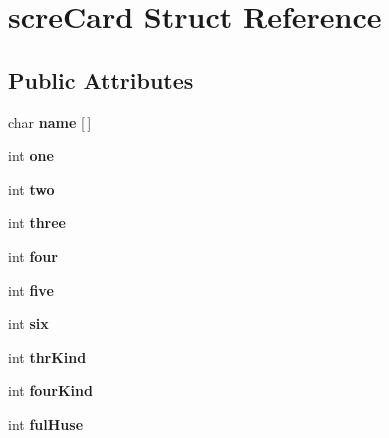 \hypertarget{structscre_card}{}\section{scre\+Card Struct Reference}
\label{structscre_card}
\subsection*{Public Attributes}
\begin{DoxyCompactItemize}
\item 
\mbox{\label{structscre_card_a142a055fa3894891503722f06c691a4d}} 
char {\bfseries name} \mbox{[}$\,$\mbox{]}
\item 
\mbox{\label{structscre_card_aca36017ce3ff1201a38b9c975c20d242}} 
int {\bfseries one}
\item 
\mbox{\label{structscre_card_a5d802886236a00e701bb68c5ba7de71e}} 
int {\bfseries two}
\item 
\mbox{\label{structscre_card_a44b505ee324fb103931d5a1e2ce9b5d1}} 
int {\bfseries three}
\item 
\mbox{\label{structscre_card_ad9586f49eeb39857826c114c5c1a65cb}} 
int {\bfseries four}
\item 
\mbox{\label{structscre_card_a39fb932db642a35d5dd156045dea5c62}} 
int {\bfseries five}
\item 
\mbox{\label{structscre_card_ae82cf09db1ccd36380a509f240b71040}} 
int {\bfseries six}
\item 
\mbox{\label{structscre_card_a5af84c119b4f58da73e851e18dfb7ae6}} 
int {\bfseries thr\+Kind}
\item 
\mbox{\label{structscre_card_ac76f9907ba8e2795968cd06042a98c42}} 
int {\bfseries four\+Kind}
\item 
\mbox{\label{structscre_card_a4a2ecf756a6e0bc87e4e049941ab40e9}} 
int {\bfseries ful\+Huse}
\item 
\mbox{\label{structscre_card_a7c159f368baece5e9486c95a17243f52}} 

\end{DoxyCompactItemize}
